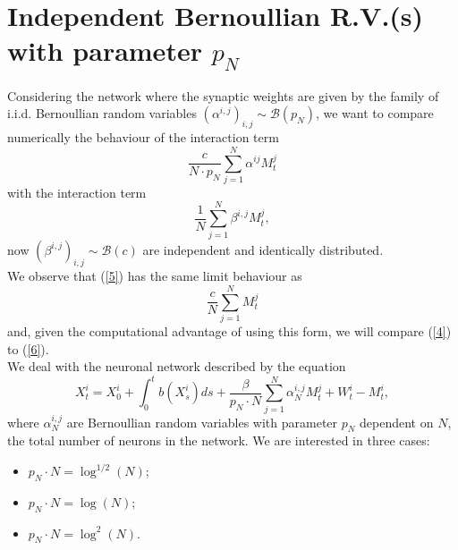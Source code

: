 \documentclass[11pt, a4paper]{article}
\begin{document}
\section{Independent Bernoullian R.V.(s) with parameter $p_N$}
Considering the network where the synaptic weights are given by the family of i.i.d. Bernoullian random variables $(\alpha^{i, j})_{i, j} \sim \mathcal{B}(p_N)$, we want to compare numerically the behaviour of the interaction term \begin{equation} \label{4} \frac{c}{N \cdot p_N} \sum_{j=1}^N \alpha^{ij} M^j_t \end{equation} with the interaction term 
\begin{equation} \label{5} \frac{1}{N} \sum_{j = 1}^N \beta^{i, j} M^j_t, \end{equation} now $(\beta^{i, j})_{i, j} \sim \mathcal{B}(c)$ are independent and identically distributed. \\
We observe that (\ref{5}) has the same limit behaviour as \begin{equation} \label{6} \frac{c}{N} \sum_{j = 1}^N M^j_t \end{equation} and, given the computational advantage of using this form, we will compare (\ref{4}) to (\ref{6}). \\


We deal with the neuronal network described by the equation \[ X^i_t = X^i_0 + \int_0^t b(X^i_s) ds + \frac{\beta}{p_N \cdot N} \sum_{j = 1}^N \alpha^{i, j}_N M^j_t + W^i_t - M^i_t, \] where $\alpha^{i, j}_N$ are Bernoullian random variables with parameter $p_N$ dependent on $N$, the total number of neurons in the network. We are interested in three cases:
\begin{itemize}
  \item $p_N \cdot N = \log^{1/2}(N)$;
  \item $p_N \cdot N = \log(N)$;
  \item $p_N \cdot N = \log^2(N)$.
\end{itemize}
\end{document}
